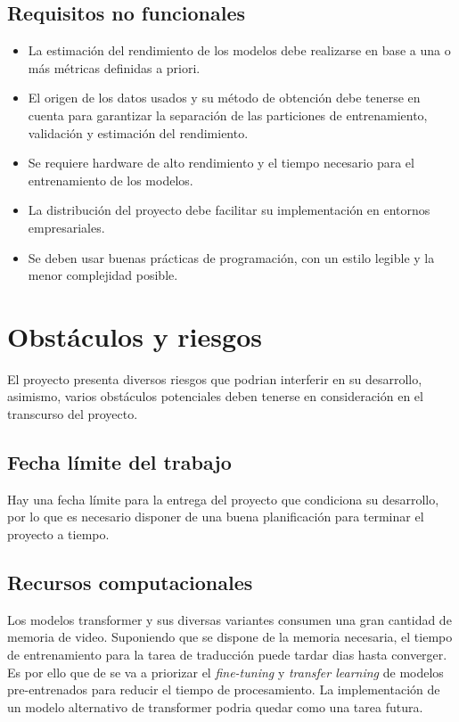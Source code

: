 \subsection{Requisitos no funcionales}
\begin{itemize}
    \item La estimación del rendimiento de los modelos debe realizarse en base a una o más métricas definidas
    a priori.
    \item El origen de los datos usados y su método de obtención debe tenerse en cuenta
    para garantizar la separación de las particiones de entrenamiento, validación y estimación del rendimiento.
    \item Se requiere hardware de alto rendimiento y el tiempo necesario para el entrenamiento
    de los modelos.
    \item La distribución del proyecto debe facilitar su implementación en entornos empresariales.
    \item Se deben usar buenas prácticas de programación, con un estilo legible y la menor
        complejidad posible.
\end{itemize}

\section{Obstáculos y riesgos}
El proyecto presenta diversos riesgos que podrian interferir en su desarrollo, asimismo, varios obstáculos
potenciales deben tenerse en consideración en el transcurso del proyecto.
\subsection{Fecha límite del trabajo}
Hay una fecha límite para la entrega del proyecto que condiciona su desarrollo, por lo que
es necesario disponer de una buena planificación para terminar el proyecto a tiempo.
\subsection{Recursos computacionales}
Los modelos transformer y sus diversas variantes consumen una gran cantidad de memoria de video.
Suponiendo que se dispone de la memoria necesaria, el tiempo de entrenamiento para la tarea de traducción
puede tardar dias hasta converger. Es por ello que de se va a priorizar el \textit{fine-tuning} y
\textit{transfer learning} de modelos pre-entrenados para reducir el tiempo de procesamiento.
La implementación de un modelo alternativo de transformer podria quedar como una tarea futura.
